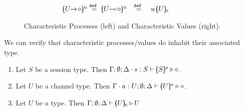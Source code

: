 \begin{figure}
\[\begin{array}{rclcrcl}
		&&
		 
		& &
 
		\\
		\mapchar{\shot{U}}{u}
		\defeq 
		\mapchar{\lhot{U}}{u}
		&\defeq &
		\appl{u}{\omapchar{U}}
		&&
		 
		& &
		 	\end{array}
	\]
%
%
%
%
%
\caption{Characteristic Processes (left) and Characteristic Values (right).\label{fig:char}}
%
\end{figure}



\noi We can verify that characteristic processes/values  
do inhabit their associated type.

\begin{proposition}
	\begin{enumerate}
		\item	
				Let $S$ be a session type.
				Then $\Gamma; \emptyset; \Delta \cdot s: S \vdash [\!\!(S)\!\!]^{s} \triangleright \diamond$.
		\item	
				Let $U$ be a channel type.
				Then $\Gamma \cdot a: U; \emptyset; \Delta \vdash [\!\!(U)\!\!]^{a} \triangleright \diamond$.

		\item	Let $U$ be a type.
				Then $\Gamma; \emptyset; \Delta \vdash [\!\!(U)\!\!]_{\mathsf{c}} \triangleright U$
	\end{enumerate}
\end{proposition}

